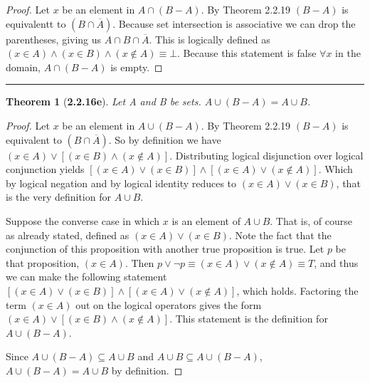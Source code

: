 \documentclass[a4paper, 12pt]{article}
\theoremstyle{plain}
\newtheorem*{theorem*}{Theorem}
\begin{document}
\begin{proof}
    Let $x$ be an element in $A \cap (B - A)$. By Theorem 2.2.19  
    $(B - A)$ is equivalentt to $(B \cap \overline{A})$. Because set intersection is associative we can 
    drop the parentheses, giving us $A \cap B \cap \overline{A}$. This is logically defined 
    as $(x \in A) \land (x \in B) \land (x \notin A) \equiv \bot$. Because this statement is 
    false $\forall x$ in the domain, $A \cap (B - A)$ is empty.
\end{proof}
\begin{center}
    \rule{5.4in}{1pt}
\end{center}


\begin{theorem*}[\textbf{2.2.16e}]
    Let A and B be sets. $A \cup (B - A) = A \cup B$.
\end{theorem*}

\begin{proof}
    Let $x$ be an element in $A \cup (B - A)$. By Theorem 2.2.19  
    $(B - A)$ is equivalent to $(B \cap \overline{A})$. So by definition we have 
    $(x \in A) \lor [(x \in B) \land (x \notin A)]$. Distributing logical disjunction over 
    logical conjunction yields \newline 
    $[(x \in A) \lor (x \in B)] \land [(x \in A) \lor (x \notin A)]$. Which by logical negation 
    and by logical identity reduces to $(x \in A) \lor (x \in B)$, that is the very definition for 
    $A \cup B$.
    
    Suppose the converse case in which  $x$ is an element of $A \cup B$. That is, of course as 
    already stated, defined as $(x \in A) \lor (x \in B)$. Note the fact that the conjunction of 
    this proposition with another true proposition is true. Let $p$ be that proposition, 
    $(x \in A)$. Then $p \lor \lnot p \equiv (x \in A) \lor (x \notin A) \equiv T$, and thus we 
    can make the following statement 
    $[(x \in A) \lor (x \in B)] \land [(x \in A) \lor (x \notin A)]$, which holds. Factoring the 
    term $(x \in A)$ out on the logical operators gives the form 
    $(x \in A) \lor [(x \in B) \land (x \notin A)]$. This statement is the definition for 
    $A \cup (B - A)$.
    
    Since $A \cup (B - A) \subseteq A \cup B$ and 
    $A \cup B \subseteq A \cup (B - A)$, 
    \newline 
    $A \cup (B - A) = A \cup B$ by definition.
\end{proof}
\end{document}
